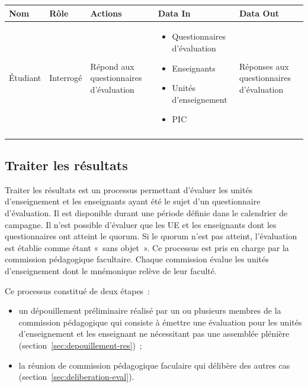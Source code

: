 \documentclass[a4paper,11pt]{report}
\begin{document}
\begin{tabularx}{\linewidth}{|l|X|X|X|X|} \hline
Nom & Rôle & Actions & Data In & Data Out \\ \hline 
Étudiant & Interrogé & Répond aux questionnaires d'évaluation & 
\begin{itemize}
	\item Questionnaires d'évaluation 
	\item Enseignants
	\item Unités d'enseignement
	\item PIC
\end{itemize}
& Réponses aux questionnaires d'évaluation \\
 & & & & \\ \hline
\end{tabularx}






\subsection{Traiter les résultats}
Traiter les résultats est un processus permettant d'évaluer les unités d'enseignement et les enseignants ayant été le sujet d'un questionnaire d'évaluation.
Il est disponible durant une période définie dans le calendrier de campagne.
Il n'est possible d'évaluer que les UE et les enseignants dont les questionnaires ont atteint le quorum.
Si le quorum n'est pas atteint, l'évaluation est établie comme étant «~sans objet~».
Ce processus est pris en charge par la commission pédagogique facultaire.
Chaque commission évalue les unités d'enseignement dont le mnémonique relève de leur faculté.

Ce processus constitué de deux étapes~:
\begin{itemize}
	\item un dépouillement préliminaire réalisé par un ou plusieurs membres de la commission pédagogique qui consiste à émettre une évaluation pour les unités d'enseignement et les enseignant ne nécessitant pas une assemblée plénière (section~\ref{sec:depouillement-res})~;
	\item la réunion de commission pédagogique faculaire qui délibère des autres cas (section~\ref{sec:deliberation-eval}).
\end{itemize}

\end{document}
